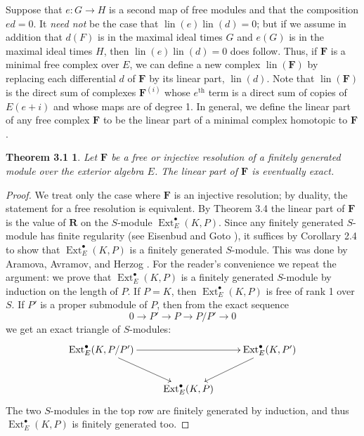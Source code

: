 \documentclass{tran-l}
\newcommand{\Ext}{{\operatorname{Ext}}}
\newcommand{\lin}{\operatorname{lin}}
\newcommand{\myth}{{\operatorname{th}}}
\newcommand{\FF}{\mathbf{F}}
\newcommand{\RR}{\mathbf{R}}
\theoremstyle{plain}
\newtheorem*{theorem10}{Theorem 3.1}
\theoremstyle{remark}
\theoremstyle{definition}
\begin{document}
Suppose that $e:G\to H$ is a second map of free modules and that the
composition $ed=0$. It {\em need not\/} be the case that
$\lin (e)\lin (d)=0$; but if we assume in addition that $d(F)$ is in the
maximal ideal times $G$ and $e(G)$ is in the maximal ideal times $H$,
then $\lin (e)\lin (d)=0$ does follow. Thus, if $\FF $ is a
minimal free complex over $E$, we can define a new complex $\lin (\FF )$
by replacing each differential $d$ of $\FF $ by its linear part,
$\lin (d)$. Note that $\lin (\FF )$ is the direct sum of complexes
$\FF ^{(i)}$ whose $e^{\myth }$ term is a direct sum of copies
of $E(e+i)$ and whose maps are of degree 1. In general, we define
the linear part of any free complex $\FF $ to be the linear part of
a minimal complex homotopic to $\FF $.
\begin{theorem10}
Let $\FF $  be a free or injective resolution
of a finitely generated module over the exterior algebra $E$. The
linear part of $\FF $ is eventually exact.
\end{theorem10}
\begin{proof}  We treat only the case where $\FF $ is an injective resolution;
by duality, the statement for a free resolution is equivalent.
By Theorem 3.4 the linear part of $\FF $ is
the value of $\RR $ on the $S$-module $\Ext _{E}^{\bullet }(K,P)$.
Since any finitely generated $S$-module has finite regularity
(see Eisenbud and Goto \cite{EG}), it suffices by Corollary 2.4
to show that
$\Ext _{E}^{\bullet }(K,P)$ is a finitely generated
$S$-module. This was done by Aramova, Avramov,
and Herzog \cite{AAH}. For the reader's convenience we repeat the
argument: we prove that $\Ext _{E}^{\bullet }(K,P)$ is a finitely generated
$S$-module by induction on the length
of $P$. If $P=K$,
then $\Ext _{E}^{\bullet }(K,P)$ is free of rank 1 over $S$. If $P'$ is a
proper submodule of $P$, then from the exact sequence
\begin{equation*}0\to P' \to P \to P/P' \to 0
\end{equation*}
we get an exact triangle of $S$-modules:
\begin{equation*}\xy \xymatrix {
\Ext _{E}^{\bullet }(K,P/P') \ar [rr]\ar [dr]&&\Ext _{E}^{\bullet }(K,P')\ar [dl]\\
&\Ext _{E}^{\bullet }(K,P)
}
\endxy \end{equation*}
The two $S$-modules in the top row are finitely generated by
induction, and thus $\Ext _{E}^{\bullet }(K,P)$ is finitely generated too.
\end{proof}
\end{document}
